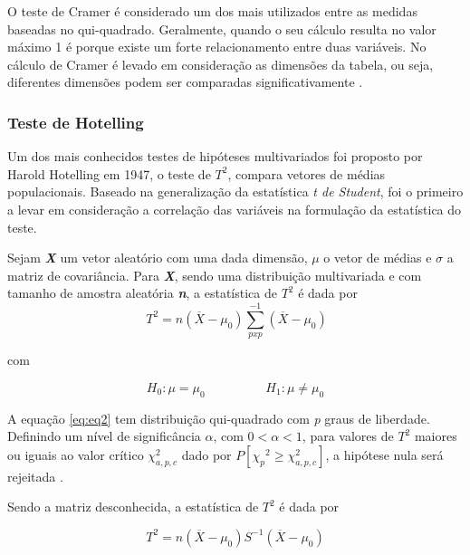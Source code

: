 O teste de Cramer é considerado um dos mais utilizados entre as medidas baseadas no qui-quadrado. Geralmente, quando o seu cálculo resulta no valor máximo 1 é porque existe um forte relacionamento entre duas variáveis. No cálculo de Cramer é levado em consideração as dimensões da tabela, ou seja, diferentes dimensões podem ser comparadas significativamente \cite{bachman2017statistics}. 

\subsubsection{Teste de Hotelling}

Um dos mais conhecidos testes de hipóteses multivariados foi proposto por Harold Hotelling em 1947, o teste de $T^2$, compara vetores de médias populacionais. Baseado na generalização da estatística \textit{t de Student}, foi o primeiro a levar em consideração a correlação das variáveis na formulação da estatística do teste.

Sejam \textbf{\textit{X}} um vetor aleatório com uma dada dimensão, \textbf{\textit{$\mu$}} o vetor de médias e \textbf{\textit{$\sigma$}} a matriz de covariância. Para \textbf{\textit{X}}, sendo uma distribuição  multivariada e com tamanho de amostra aleatória \textbf{\textit{n}}, a estatística de $T^2$ é dada por
\begin{equation}
\ T^2 = n(\overline{X} - \mu_0) \sum_{pxp}^{-1} {(\overline{X} - \mu_0)}
\label{eq:eq2}
\end{equation}

com

\begin{equation}
 H_0 : \mu = \mu_0 \hspace{2cm} H_1 : \mu \neq \mu_0
\label{eq:eq3}
\end{equation}

A equação \ref{eq:eq2} tem distribuição qui-quadrado com \textit{p} graus de liberdade. Definindo um nível de significância $\alpha$, com $0 < \alpha < 1$, para valores de $T^2$  maiores ou iguais ao valor crítico ${\chi^2_{a,p,c}}$ dado por $P[{\chi_p}^2 \geq {\chi^2_{a,p,c}}]$,  a hipótese nula será rejeitada \cite{mudholkar2000robust}.    

Sendo a matriz desconhecida, a estatística de $T^2$ é dada por

\begin{equation}
T^2 = n(\overline{X} -\mu_0) S^{-1}(\overline{X} - \mu_0)
\label{eq:eq4}
\end{equation}

